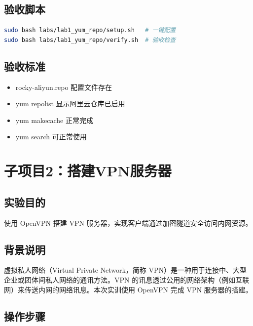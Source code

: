 \documentclass[12pt,a4paper]{ctexart}
\begin{document}
\subsection{验收脚本}

\begin{cmdbox}
\small
\begin{lstlisting}[language=bash]
sudo bash labs/lab1_yum_repo/setup.sh   # 一键配置
sudo bash labs/lab1_yum_repo/verify.sh  # 验收检查
\end{lstlisting}
\end{cmdbox}

\subsection{验收标准}

\begin{itemize}
  \item rocky-aliyun.repo 配置文件存在
  \item yum repolist 显示阿里云仓库已启用
  \item yum makecache 正常完成
  \item yum search 可正常使用
\end{itemize}

\newpage
\section{子项目2：搭建VPN服务器}

\subsection{实验目的}

使用 OpenVPN 搭建 VPN 服务器，实现客户端通过加密隧道安全访问内网资源。

\subsection{背景说明}

虚拟私人网络（Virtual Private Network，简称 VPN）是一种用于连接中、大型企业或团体间私人网络的通讯方法。VPN 的讯息透过公用的网络架构（例如互联网）来传送内网的网络讯息。本次实训使用 OpenVPN 完成 VPN 服务器的搭建。

\subsection{操作步骤}
\end{document}
